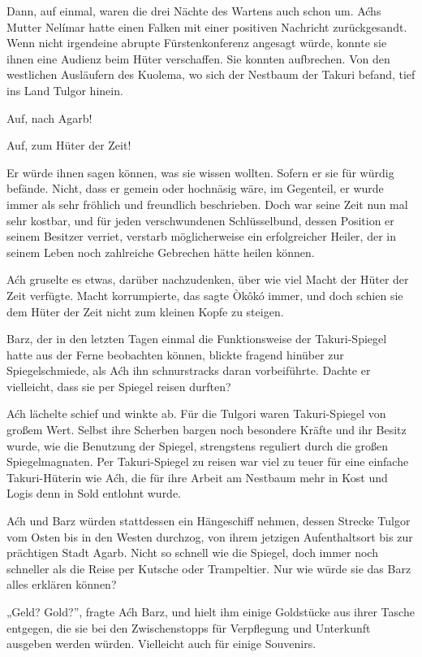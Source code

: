 Dann, auf einmal, waren die drei Nächte des Wartens auch schon um. Aćhs Mutter Nelímar hatte einen Falken mit einer positiven Nachricht zurückgesandt. Wenn nicht irgendeine abrupte Fürstenkonferenz angesagt würde, konnte sie ihnen eine Audienz beim Hüter verschaffen. Sie konnten aufbrechen. Von den westlichen Ausläufern des Kuolema, wo sich der Nestbaum der Takuri befand, tief ins Land Tulgor hinein.

Auf, nach Agarb!

Auf, zum Hüter der Zeit!

Er würde ihnen sagen können, was sie wissen wollten. Sofern er sie für würdig befände. Nicht, dass er gemein oder hochnäsig wäre, im Gegenteil, er wurde immer als sehr fröhlich und freundlich beschrieben. Doch war seine Zeit nun mal sehr kostbar, und für jeden verschwundenen Schlüsselbund, dessen Position er seinem Besitzer verriet, verstarb möglicherweise ein erfolgreicher Heiler, der in seinem Leben noch zahlreiche Gebrechen hätte heilen können.

Aćh gruselte es etwas, darüber nachzudenken, über wie viel Macht der Hüter der Zeit verfügte. Macht korrumpierte, das sagte Òkôkó immer, und doch schien sie dem Hüter der Zeit nicht zum kleinen Kopfe zu steigen.

Barz, der in den letzten Tagen einmal die Funktionsweise der Takuri-Spiegel hatte aus der Ferne beobachten können, blickte fragend hinüber zur Spiegelschmiede, als Aćh ihn schnurstracks daran vorbeiführte. Dachte er vielleicht, dass sie per Spiegel reisen durften?

Aćh lächelte schief und winkte ab. Für die Tulgori waren Takuri-Spiegel von großem Wert. Selbst ihre Scherben bargen noch besondere Kräfte und ihr Besitz wurde, wie die Benutzung der Spiegel, strengstens reguliert durch die großen Spiegelmagnaten. Per Takuri-Spiegel zu reisen war viel zu teuer für eine einfache Takuri-Hüterin wie Aćh, die für ihre Arbeit am Nestbaum mehr in Kost und Logis denn in Sold entlohnt wurde.

Aćh und Barz würden stattdessen ein Hängeschiff nehmen, dessen Strecke Tulgor vom Osten bis in den Westen durchzog, von ihrem jetzigen Aufenthaltsort bis zur prächtigen Stadt Agarb. Nicht so schnell wie die Spiegel, doch immer noch schneller als die Reise per Kutsche oder Trampeltier. Nur wie würde sie das Barz alles erklären können?

„Geld? Gold?”, fragte Aćh Barz, und hielt ihm einige Goldstücke aus ihrer Tasche entgegen, die sie bei den Zwischenstopps für Verpflegung und Unterkunft ausgeben werden würden. Vielleicht auch für einige Souvenirs.

